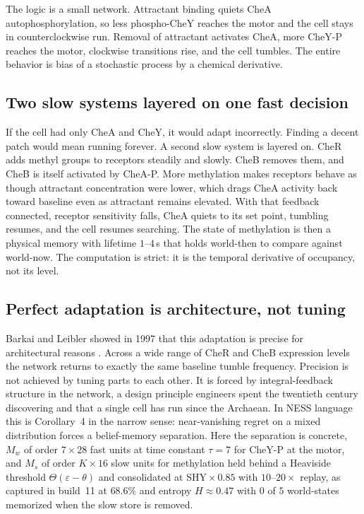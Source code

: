 \documentclass[12pt,a4paper]{article}
\begin{document}
The logic is a small network. Attractant binding quiets CheA autophosphorylation, so less phospho-CheY reaches the motor and the cell stays in counterclockwise run. Removal of attractant activates CheA, more CheY-P reaches the motor, clockwise transitions rise, and the cell tumbles. The entire behavior is bias of a stochastic process by a chemical derivative.

\subsection{Two slow systems layered on one fast decision}

If the cell had only CheA and CheY, it would adapt incorrectly. Finding a decent patch would mean running forever. A second slow system is layered on. CheR adds methyl groups to receptors steadily and slowly. CheB removes them, and CheB is itself activated by CheA-P. More methylation makes receptors behave as though attractant concentration were lower, which drags CheA activity back toward baseline even as attractant remains elevated. With that feedback connected, receptor sensitivity falls, CheA quiets to its set point, tumbling resumes, and the cell resumes searching. The state of methylation is then a physical memory with lifetime $1$--$4$\,s that holds world-then to compare against world-now. The computation is strict: it is the temporal derivative of occupancy, not its level.

\subsection{Perfect adaptation is architecture, not tuning}

Barkai and Leibler showed in 1997 that this adaptation is precise for architectural reasons \cite{barkai1997}. Across a wide range of CheR and CheB expression levels the network returns to exactly the same baseline tumble frequency. Precision is not achieved by tuning parts to each other. It is forced by integral-feedback structure in the network, a design principle engineers spent the twentieth century discovering and that a single cell has run since the Archaean. In NESS language this is Corollary~4 in the narrow sense: near-vanishing regret on a mixed distribution forces a belief-memory separation. Here the separation is concrete, $M_w$ of order $7 \times 28$ fast units at time constant $\tau=7$ for CheY-P at the motor, and $M_s$ of order $K \times 16$ slow units for methylation held behind a Heaviside threshold $\Theta(\varepsilon - \theta)$ and consolidated at $\mathrm{SHY} \times 0.85$ with $10$--$20\times$ replay, as captured in build~11 at $68.6\%$ and entropy $H \approx 0.47$ with $0$ of $5$ world-states memorized when the slow store is removed.
\end{document}
